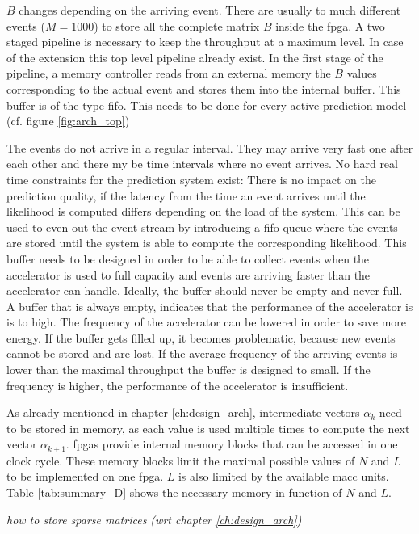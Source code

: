 \documentclass[mscthesis]{usiinfthesis}
\begin{document}
$B$ changes depending on the arriving event. There are usually to much
different events ($M=1000$) to store all the complete matrix $B$ inside the
\gls{fpga}. A two staged pipeline is necessary to keep the throughput at
a maximum level. In case of the extension this top level pipeline already
exist. In the first stage of the pipeline, a memory controller reads from an
external memory the $B$ values corresponding to the actual event and stores
them into the internal buffer. This buffer is of the type \gls{fifo}. This
needs to be done for every active prediction model (cf.  figure
\ref{fig:arch_top})

The events do not arrive in a regular interval. They may arrive very fast one
after each other and there my be time intervals where no event arrives. No hard
real time constraints for the prediction system exist: There is no impact on
the prediction quality, if the latency from the time an event arrives until the
likelihood is computed differs depending on the load of the system. This can be
used to even out the event stream by introducing a \gls{fifo} queue where the
events are stored until the system is able to compute the corresponding
likelihood. This buffer needs to be designed in order to be able to collect
events when the accelerator is used to full capacity and events are arriving
faster than the accelerator can handle. Ideally, the buffer should never be
empty and never full. A buffer that is always empty, indicates that the
performance of the accelerator is is to high. The frequency of the accelerator
can be lowered in order to save more energy. If the buffer gets filled up, it
becomes problematic, because new events cannot be stored and are lost. If the
average frequency of the arriving events is lower than the maximal throughput
the buffer is designed to small.  If the frequency is higher, the performance
of the accelerator is insufficient.

As already mentioned in chapter \ref{ch:design_arch}, intermediate vectors
$\alpha_k$ need to be stored in memory, as each value is used multiple times to
compute the next vector $\alpha_{k+1}$. \glspl{fpga} provide internal memory
blocks that can be accessed in one clock cycle. These memory blocks limit the
maximal possible values of $N$ and $L$ to be implemented on one \gls{fpga}. $L$
is also limited by the available \gls{macc} units. Table \ref{tab:summary_D}
shows the necessary memory in function of $N$ and $L$.

\emph{\color{red}how to store sparse matrices (wrt chapter
\ref{ch:design_arch})}
\end{document}
